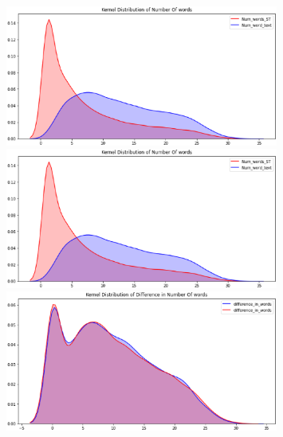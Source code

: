 \documentclass[
 size=14pt,
 paper=smartboard,  %
 mode=present, 		%
 display=slides, 	%
 style=tuliplab,  	%
 pauseslide,
 fleqn,leqno]{powerdot}
\begin{document}
\begin{slide}[toc=,bm=]{}

\begin{figure}[htbp]
  \centering
  \begin{minipage}[t]{0.48\textwidth}
    \centering
    \includegraphics[width=0.8\textwidth]{kaggle/1.1.eps}
    \vspace{0.4em}
    \caption{ }
  \end{minipage}
  \begin{minipage}[t]{0.48\textwidth}
    \centering
    \includegraphics[width=0.8\textwidth]{kaggle/1.2.eps}
    \vspace{0.4em}
    \caption{}
  \end{minipage}
  \begin{minipage}[t]{0.48\textwidth}
    \centering
    \includegraphics[width=0.8\textwidth]{kaggle/1.3.eps}
    \vspace{0.4em}
    \caption{}
  \end{minipage}
\end{figure}


\end{slide}
\end{document}
